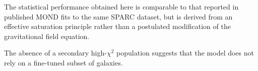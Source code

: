   The statistical performance obtained here is comparable to that
  reported in published MOND fits to the same SPARC dataset,
  but is derived from an effective saturation principle rather than
  a postulated modification of the gravitational field equation.

  The absence of a secondary high-$\chi^2$ population suggests that the model does not rely on a fine-tuned subset of
  galaxies.
